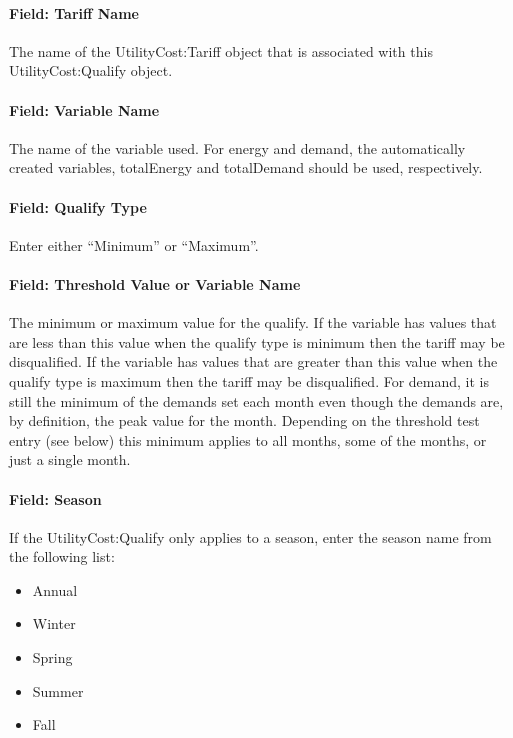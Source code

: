 \paragraph{Field: Tariff Name}\label{field-tariff-name-002}

The name of the UtilityCost:Tariff object that is associated with this UtilityCost:Qualify object.

\paragraph{Field: Variable Name}\label{field-variable-name-001}

The name of the variable used. For energy and demand, the automatically created variables, totalEnergy and totalDemand should be used, respectively.

\paragraph{Field: Qualify Type}\label{field-qualify-type}

Enter either ``Minimum'' or ``Maximum''.

\paragraph{Field: Threshold Value or Variable Name}\label{field-threshold-value-or-variable-name}

The minimum or maximum value for the qualify. If the variable has values that are less than this value when the qualify type is minimum then the tariff may be disqualified. If the variable has values that are greater than this value when the qualify type is maximum then the tariff may be disqualified. For demand, it is still the minimum of the demands set each month even though the demands are, by definition, the peak value for the month. Depending on the threshold test entry (see below) this minimum applies to all months, some of the months, or just a single month.

\paragraph{Field: Season}\label{field-season-001}

If the UtilityCost:Qualify only applies to a season, enter the season name from the following list:

\begin{itemize}
\item
  Annual
\item
  Winter
\item
  Spring
\item
  Summer
\item
  Fall
\end{itemize}

